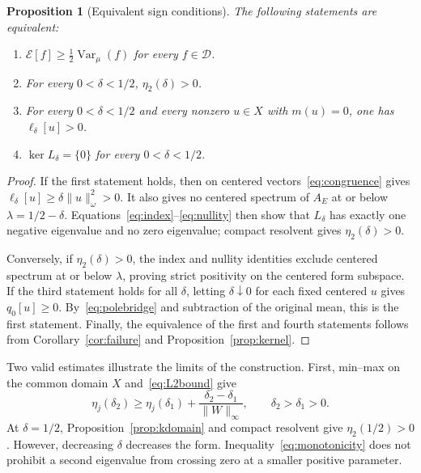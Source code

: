 \documentclass[11pt,a4paper]{article}
\numberwithin{equation}{section}
\newtheorem{proposition}[theorem]{Proposition}
\theoremstyle{remark}
\newcommand{\E}{\mathcal E}
\newcommand{\D}{\mathcal D}
\newcommand{\Var}{\operatorname{Var}}
\newcommand{\norm}[1]{\lVert #1\rVert}
\begin{document}
\begin{proposition}[Equivalent sign conditions]\label{prop:sign}
The following statements are equivalent:
\begin{enumerate}
\item $\E[f]\ge\tfrac12\Var_\mu(f)$ for every $f\in\D$.
\item For every $0<\delta<1/2$, $\eta_2(\delta)>0$.
\item For every $0<\delta<1/2$ and every nonzero $u\in X$ with $m(u)=0$, one has $\ell_\delta[u]>0$.
\item $\ker L_\delta=\{0\}$ for every $0<\delta<1/2$.
\end{enumerate}
\end{proposition}
\begin{proof}
If the first statement holds, then on centered vectors~\eqref{eq:congruence} gives $\ell_\delta[u]\ge\delta\norm{u}_\omega^2>0$. It also gives no centered spectrum of $A_E$ at or below $\lambda=1/2-\delta$. Equations~\eqref{eq:index}--\eqref{eq:nullity} then show that $L_\delta$ has exactly one negative eigenvalue and no zero eigenvalue; compact resolvent gives $\eta_2(\delta)>0$.

Conversely, if $\eta_2(\delta)>0$, the index and nullity identities exclude centered spectrum at or below $\lambda$, proving strict positivity on the centered form subspace. If the third statement holds for all $\delta$, letting $\delta\downarrow0$ for each fixed centered $u$ gives $q_0[u]\ge0$. By~\eqref{eq:polebridge} and subtraction of the original mean, this is the first statement. Finally, the equivalence of the first and fourth statements follows from Corollary~\ref{cor:failure} and Proposition~\ref{prop:kernel}.
\end{proof}

Two valid estimates illustrate the limits of the construction. First, min--max on the common domain $X$ and~\eqref{eq:L2bound} give
\begin{equation}\label{eq:monotonicity}
 \eta_j(\delta_2)\ge\eta_j(\delta_1)
       +\frac{\delta_2-\delta_1}{\norm{W}_\infty},
       \qquad\delta_2>\delta_1>0.
\end{equation}
At $\delta=1/2$, Proposition~\ref{prop:kdomain} and compact resolvent give $\eta_2(1/2)>0$. However, decreasing $\delta$ decreases the form. Inequality~\eqref{eq:monotonicity} does not prohibit a second eigenvalue from crossing zero at a smaller positive parameter.
\end{document}
